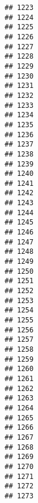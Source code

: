 \documentclass[
]{article}
\begin{document}
\begin{verbatim}
## 1223                                           
## 1224                                           
## 1225                                           
## 1226                                           
## 1227                                           
## 1228                                           
## 1229                                           
## 1230                                           
## 1231                                           
## 1232                                           
## 1233                                           
## 1234                                           
## 1235                                           
## 1236                                           
## 1237                                           
## 1238                                           
## 1239                                           
## 1240                                           
## 1241                                           
## 1242                                           
## 1243                                           
## 1244                                           
## 1245                                           
## 1246                                           
## 1247                                           
## 1248                                           
## 1249                                           
## 1250                                           
## 1251                                           
## 1252                                           
## 1253                                           
## 1254                                           
## 1255                                           
## 1256                                           
## 1257                                           
## 1258                                           
## 1259                                           
## 1260                                           
## 1261                                           
## 1262                                           
## 1263                                           
## 1264                                           
## 1265                                           
## 1266                                           
## 1267                                           
## 1268                                           
## 1269                                           
## 1270                                           
## 1271                                           
## 1272                                           
## 1273                                           

\end{verbatim}
\end{document}
